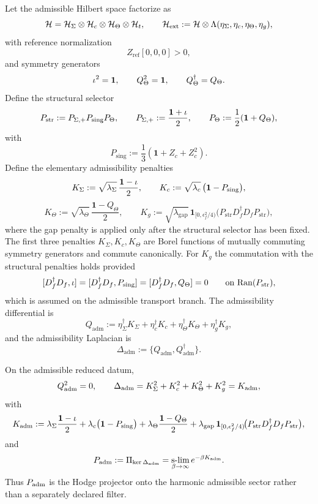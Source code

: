 \begin{definition}
\label{def:admissibility-complex}
Let the admissible Hilbert space factorize as
\[
\mathcal H=\mathcal H_{\Sigma}\otimes\mathcal H_c\otimes\mathcal H_\Theta\otimes\mathcal H_t,
\qquad
\mathcal H_{\mathrm{ext}}
:=
\mathcal H\otimes\Lambda(\eta_\Sigma,\eta_c,\eta_\Theta,\eta_g),
\]
with reference normalization
\[
Z_{\mathrm{ref}}[0,0,0]>0,
\]
and symmetry generators
\[
\iota^2=\mathbf 1,
\qquad
Q_\Theta^2=\mathbf 1,
\qquad
Q_\Theta^\dagger=Q_\Theta.
\]
Define the structural selector
\[
P_{\mathrm{str}}:=P_{\Sigma,+}P_{\mathrm{sing}}P_\Theta,
\qquad
P_{\Sigma,+}:=\frac{\mathbf 1+\iota}{2},
\qquad
P_\Theta:=\frac12(\mathbf 1+Q_\Theta),
\]
with
\[
P_{\mathrm{sing}}:=\frac13(\mathbf 1+Z_c+Z_c^2).
\]
Define the elementary admissibility penalties
\[
K_\Sigma:=\sqrt{\lambda_\Sigma}\,\frac{\mathbf 1-\iota}{2},
\qquad
K_c:=\sqrt{\lambda_c}\,\bigl(\mathbf 1-P_{\mathrm{sing}}\bigr),
\]
\[
K_\Theta:=\sqrt{\lambda_\Theta}\,\frac{\mathbf 1-Q_\Theta}{2},
\qquad
K_g:=\sqrt{\lambda_{\mathrm{gap}}}\,\mathbf 1_{[0,\epsilon_f^2/4)}\!\bigl(P_{\mathrm{str}}D_f^\dagger D_f P_{\mathrm{str}}\bigr),
\]
where the gap penalty is applied only after the structural selector has been fixed.
The first three penalties $K_\Sigma,K_c,K_\Theta$ are Borel functions of mutually commuting
symmetry generators and commute canonically. For $K_g$ the commutation with the structural
penalties holds provided
\[
[D_f^\dagger D_f,\iota]=[D_f^\dagger D_f,P_{\mathrm{sing}}]=[D_f^\dagger D_f,Q_\Theta]=0
\qquad
\text{on }\mathrm{Ran}(P_{\mathrm{str}}),
\]
which is assumed on the admissible transport branch. The admissibility differential is
\[
Q_{\mathrm{adm}}
:=
\eta_\Sigma^\dagger K_\Sigma
+\eta_c^\dagger K_c
+\eta_\Theta^\dagger K_\Theta
+\eta_g^\dagger K_g,
\]
and the admissibility Laplacian is
\[
\Delta_{\mathrm{adm}}:=\{Q_{\mathrm{adm}},Q_{\mathrm{adm}}^\dagger\}.
\]
\end{definition}

\begin{lemma}
\label{lem:admissibility-nilpotency}
\label{lem:hodge-admissibility-projector}
On the admissible reduced datum,
\[
Q_{\mathrm{adm}}^2=0,
\qquad
\Delta_{\mathrm{adm}}
=
K_\Sigma^2+K_c^2+K_\Theta^2+K_g^2
=
K_{\mathrm{adm}},
\]
with
\[
K_{\mathrm{adm}}
:=
\lambda_\Sigma\frac{\mathbf 1-\iota}{2}
+\lambda_c\bigl(\mathbf 1-P_{\mathrm{sing}}\bigr)
+\lambda_\Theta\frac{\mathbf 1-Q_\Theta}{2}
+\lambda_{\mathrm{gap}}\,\mathbf 1_{[0,\epsilon_f^2/4)}\!\bigl(P_{\mathrm{str}}D_f^\dagger D_f P_{\mathrm{str}}\bigr),
\]
and
\[
P_{\mathrm{adm}}
:=
\Pi_{\ker\Delta_{\mathrm{adm}}}
=
\operatorname*{s-lim}_{\beta\to\infty}e^{-\beta K_{\mathrm{adm}}}.
\]
Thus $P_{\mathrm{adm}}$ is the Hodge projector onto the harmonic admissible sector rather than a
separately declared filter.
\end{lemma}

